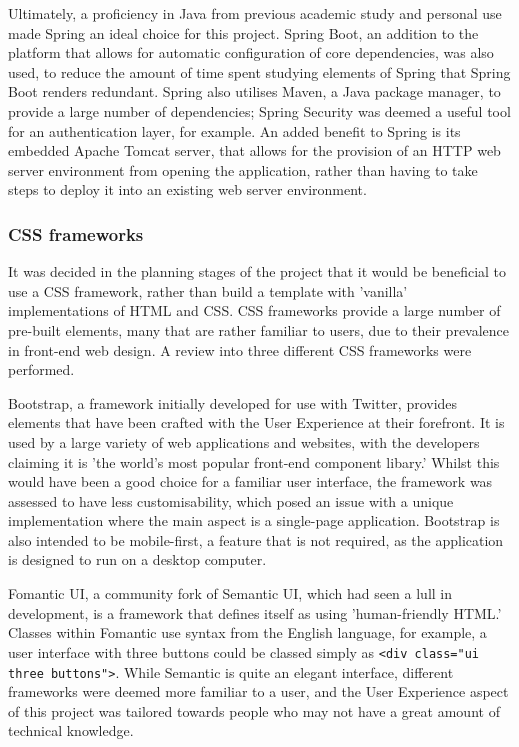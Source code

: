 Ultimately, a proficiency in Java from previous academic study and personal use made Spring an ideal choice for this project. Spring Boot, an addition to the platform that allows for automatic configuration of core dependencies, was also used, to reduce the amount of time spent studying elements of Spring that Spring Boot renders redundant. Spring also utilises Maven, a Java package manager, to provide a large number of dependencies; Spring Security was deemed a useful tool for an authentication layer, for example. An added benefit to Spring is its embedded Apache Tomcat server, that allows for the provision of an HTTP web server environment from opening the application, rather than having to take steps to deploy it into an existing web server environment.

\subsubsection{CSS frameworks}

It was decided in the planning stages of the project that it would be beneficial to use a CSS framework, rather than build a template with 'vanilla' implementations of HTML and CSS. CSS frameworks provide a large number of pre-built elements, many that are rather familiar to users, due to their prevalence in front-end web design. A review into three different CSS frameworks were performed.

Bootstrap, a framework initially developed for use with Twitter, provides elements that have been crafted with the User Experience at their forefront. It is used by a large variety of web applications and websites, with the developers claiming it is 'the world's most popular front-end component libary.' Whilst this would have been a good choice for a familiar user interface, the framework was assessed to have less customisability, which posed an issue with a unique implementation where the main aspect is a single-page application. Bootstrap is also intended to be mobile-first, a feature that is not required, as the application is designed to run on a desktop computer\cite{CochranDavid2012TBwd}.

Fomantic UI, a community fork of Semantic UI, which had seen a lull in development, is a framework that defines itself as using 'human-friendly HTML.' Classes within Fomantic use syntax from the English language, for example, a user interface with three buttons could be classed simply as \texttt{<div class="ui three buttons">}. While Semantic is quite an elegant interface, different frameworks were deemed more familiar to a user, and the User Experience aspect of this project was tailored towards people who may not have a great amount of technical knowledge\cite{Fomantic}.

